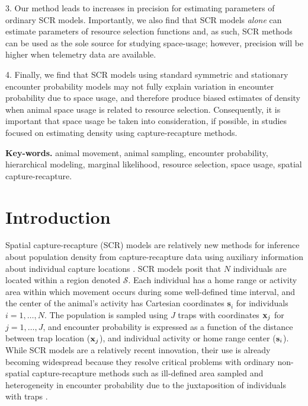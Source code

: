 \documentclass[12pt]{article}
\begin{document}
3.  Our method leads to increases in precision for estimating
parameters of ordinary SCR models.  Importantly, we also find that SCR
models {\it alone} can estimate parameters of resource selection
functions and, as such, SCR methods can be used as the sole source for
studying space-usage; however, precision will be higher when telemetry
data are available.

4. Finally, we find that SCR models using standard symmetric and
stationary encounter probability models may not fully explain
variation in encounter probability due to space usage, and therefore
produce biased estimates of density when animal space usage is related
to resource selection.  Consequently, it is important that space usage
be taken into consideration, if possible, in studies focused on
estimating density using capture-recapture methods.

\vspace{.2in}

{\bf Key-words. }
animal movement, animal sampling, encounter
probability, hierarchical modeling,
marginal likelihood,
resource selection, space usage,  spatial capture-recapture. \\


\section{Introduction}

Spatial capture-recapture (SCR) models are relatively new methods for
inference about population density from capture-recapture data using
auxiliary information about individual capture locations
\citep{efford:2004,borchers_efford:2008, royle_young:2008}.  SCR
models posit that $N$ individuals are located within a region denoted
$\mathcal{S}$. Each individual has a home range or activity area
within which movement occurs during some well-defined time interval,
and the center of the animal's activity has Cartesian coordinates
$\mathbf{s}_i$ for individuals $i=1,\ldots,N$. The population is sampled using $J$
traps with coordinates ${\bf x}_{j}$ for $j=1,\ldots,J$, and encounter
probability is expressed as a function of the distance between trap
location (${\bf x}_{j}$), and individual activity or home range center (${\bf
  s}_{i}$).
While SCR models are a relatively recent innovation, their use is already becoming widespread
\citep{efford_etal:2009ecol, gardner_etal:2010jwm,
  gardner_etal:2010ecol,kery_etal:2011, gopalaswamy_etal:2012ecol,
  foster_harmsen:2012} because they resolve critical problems with
ordinary non-spatial capture-recapture methods such as ill-defined
area sampled and heterogeneity in encounter probability due to the
juxtaposition of individuals with traps
\citep{borchers:2011}.
\end{document}
